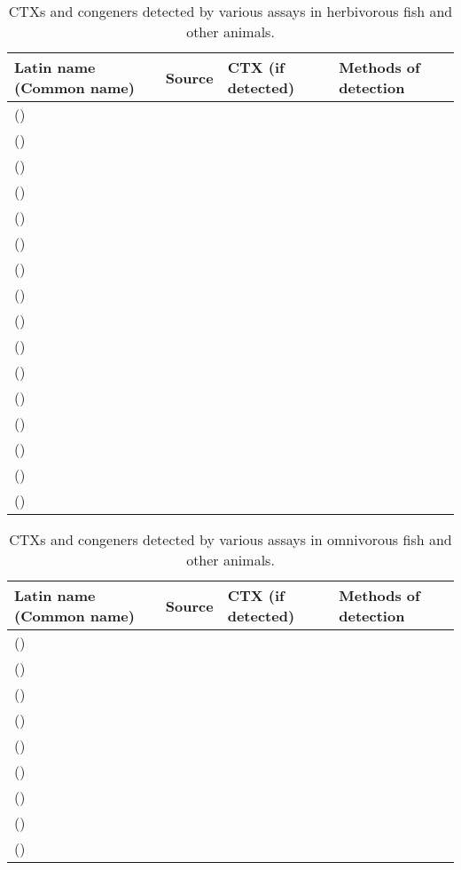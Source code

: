 \documentclass[12pt]{article}
\begin{document}
\begin{table}
\caption{CTXs and congeners detected by various assays in herbivorous fish and other animals.}
\begin{tabular}{ | p{3cm} | p{4.5cm} | p{2.95cm} | p{3.95cm} | }
\hline
\textbf{Latin name (Common name)} & \textbf{Source} & \textbf{CTX (if detected)} & \textbf{Methods of detection} \\
\hline
 \emph{} () &  &  & \\
\hline
 \emph{} ()  &  &  & \\
\hline
  \emph{} () &  &  & \\
\hline
 \emph{} () &  &  & \\
\hline
  \emph{} () &  &  & \\
\hline
  \emph{} () &  &  & \\
\hline
  \emph{} () &  &  & \\
\hline
  \emph{} () &  &  & \\
\hline
 \emph{} ()  &  &  & \\
\hline
 \emph{} ()  &  &  & \\
\hline
  \emph{} () &  &  & \\
\hline
  \emph{} () &  &  & \\
\hline
  \emph{} () &  &  & \\
\hline
  \emph{} () &  &  & \\
\hline
 \emph{} ()  &  &  & \\
\hline
  \emph{} () &  &  & \\
\hline
\end{tabular}
\end{table}
\FloatBarrier
\begin{table}
\caption{CTXs and congeners detected by various assays in omnivorous fish and other animals.}
\begin{tabular}{ | p{3cm} | p{4.5cm} | p{2.95cm} | p{3.95cm} | }
\hline
\textbf{Latin name (Common name)} & \textbf{Source} & \textbf{CTX (if detected)} & \textbf{Methods of detection} \\
\hline
   \emph{} () &  &  & \\
\hline
  \emph{} ()  &  &  & \\
\hline
  \emph{} ()  &  &  & \\
\hline
  \emph{} () &  &  & \\
\hline
   \emph{} () &  &  & \\
\hline
   \emph{} () &  &  & \\
\hline
  \emph{} ()  &  &  & \\
\hline
   \emph{} () &  &  & \\
\hline
   \emph{} () &  &  & \\
\hline
\end{tabular}
\end{table}
\end{document}
